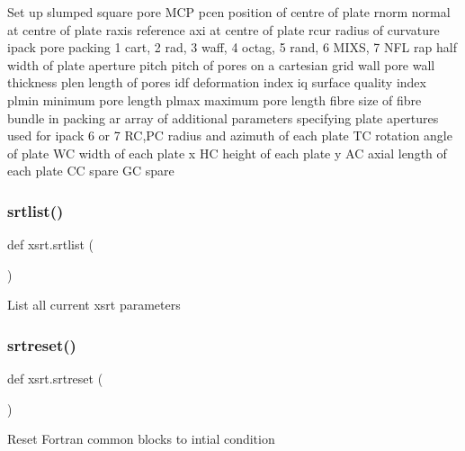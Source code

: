 \begin{DoxyVerb}Set up slumped square pore MCP
    pcen      position of centre of plate
    rnorm     normal at centre of plate
    raxis     reference axi at centre of plate
    rcur      radius of curvature
    ipack     pore packing
                1 cart, 2 rad, 3 waff, 4 octag, 5 rand, 6 MIXS, 7 NFL
    rap       half width of plate aperture
    pitch     pitch of pores on a cartesian grid
    wall      pore wall thickness
    plen      length of pores
    idf       deformation index
    iq        surface quality index
    plmin     minimum pore length
    plmax     maximum pore length
    fibre     size of fibre bundle in packing
    ar        array of additional parameters specifying plate apertures
              used for ipack 6 or 7
              RC,PC  radius and azimuth of each plate
              TC     rotation angle of plate
              WC     width of each plate x
              HC     height of each plate y 
              AC     axial length of each plate
              CC     spare
              GC     spare
\end{DoxyVerb}
 \mbox{\label{namespacexsrt_a9e999fe3e5a9e7bacfd88e095433be67}} 
\subsubsection{\texorpdfstring{srtlist()}{srtlist()}}
{\footnotesize\ttfamily def xsrt.\+srtlist (\begin{DoxyParamCaption}{ }\end{DoxyParamCaption})}

\begin{DoxyVerb}List all current xsrt parameters\end{DoxyVerb}
 \mbox{\label{namespacexsrt_ae664e35bbb9605ccff3308f416c4d56a}} 
\subsubsection{\texorpdfstring{srtreset()}{srtreset()}}
{\footnotesize\ttfamily def xsrt.\+srtreset (\begin{DoxyParamCaption}{ }\end{DoxyParamCaption})}

\begin{DoxyVerb}Reset Fortran common blocks to intial condition\end{DoxyVerb}
 \mbox{\label{namespacexsrt_a31e150698932706543329efe1c26b733}} 
